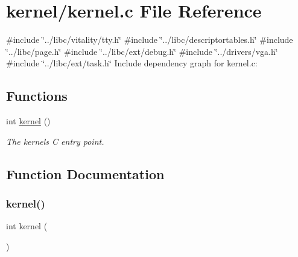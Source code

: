 \hypertarget{a00020}{}\section{kernel/kernel.c File Reference}
\label{a00020}
{\ttfamily \#include \char`\"{}../libc/vitality/tty.\+h\char`\"{}}\newline
{\ttfamily \#include \char`\"{}../libc/descriptortables.\+h\char`\"{}}\newline
{\ttfamily \#include \char`\"{}../libc/page.\+h\char`\"{}}\newline
{\ttfamily \#include \char`\"{}../libc/ext/debug.\+h\char`\"{}}\newline
{\ttfamily \#include \char`\"{}../drivers/vga.\+h\char`\"{}}\newline
{\ttfamily \#include \char`\"{}../libc/ext/task.\+h\char`\"{}}\newline
Include dependency graph for kernel.\+c\+:
\subsection*{Functions}
\begin{DoxyCompactItemize}
\item 
int \hyperlink{a00020_a4ee3d1f05046b7afc6b4d516bf10667a_a4ee3d1f05046b7afc6b4d516bf10667a}{kernel} ()
\begin{DoxyCompactList}\small\item\em The kernels C entry point. \end{DoxyCompactList}\end{DoxyCompactItemize}


\subsection{Function Documentation}
\mbox{\label{a00020_a4ee3d1f05046b7afc6b4d516bf10667a_a4ee3d1f05046b7afc6b4d516bf10667a}} 
\subsubsection{\texorpdfstring{kernel()}{kernel()}}
{\footnotesize\ttfamily int kernel (\begin{DoxyParamCaption}{ }\end{DoxyParamCaption})}



